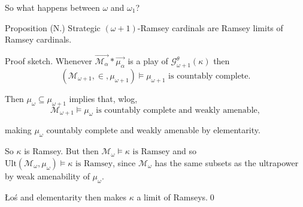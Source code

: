 \documentclass{beamer}
\begin{document}
\begin{frame}{So what happens between $\omega$ and $\omega_1$?}

\begin{block}{Proposition (N.)}
    Strategic $(\omega{+}1)$-Ramsey cardinals are Ramsey limits of Ramsey cardinals.
  \end{block}

  \pause\alert{Proof sketch.} Whenever $\vec{\mathcal M_\alpha}*\vec{\mu_\alpha}$ is a play of $\mathcal G_{\omega+1}^\theta(\kappa)$ then
$$ (\mathcal M_{\omega+1},\in,\mu_{\omega+1})\models\text{$\mu_{\omega+1}$ is countably complete}.$$

\pause Then $\mu_\omega\subseteq\mu_{\omega+1}$ implies that, wlog,
$$ \mathcal M_{\omega+1}\models\text{$\mu_\omega$ is countably complete and weakly amenable},$$

making $\mu_\omega$ countably complete and weakly amenable by elementarity.

\pause\qquad So $\kappa$ is Ramsey. \pause\pause But then $\mathcal M_\omega\models\text{$\kappa$ is Ramsey}$ and so $\text{Ult}(\mathcal M_\omega,\mu_\omega)\models\text{$\kappa$ is Ramsey}$, since $\mathcal M_\omega$ has the same subsets as the ultrapower by weak amenability of $\mu_\omega$.

\pause\qquad \L o\' s and elementarity then makes $\kappa$ a limit of Ramseys.\qed

\end{frame}
\end{document}
